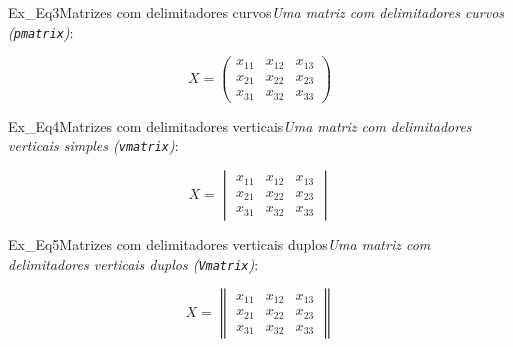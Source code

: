 \begin{texercise}{Ex_Eq3}{Matrizes com delimitadores curvos}\textit{Uma matriz com delimitadores curvos ({\tt pmatrix})}:\par\smallskip%
\begin{tcboutputlisting}
    \begin{center}
        \begin{equation*}
            X =
            \begin{pmatrix} 
                x_{11} & x_{12} & x_{13} \\ 
                x_{21} & x_{22} & x_{23} \\ 
                x_{31} & x_{32} & x_{33} 
            \end{pmatrix}
        \end{equation*}
    \end{center}
\end{tcboutputlisting}
\tcbuselistingtext%
\end{texercise}

\begin{texercise}{Ex_Eq4}{Matrizes com delimitadores verticais}\textit{Uma matriz com delimitadores verticais simples ({\tt vmatrix})}:\par\smallskip%
\begin{tcboutputlisting}
    \begin{center}
        \begin{equation*}
            X =
            \begin{vmatrix} 
                x_{11} & x_{12} & x_{13} \\ 
                x_{21} & x_{22} & x_{23} \\ 
                x_{31} & x_{32} & x_{33} 
            \end{vmatrix}
        \end{equation*}
    \end{center}
\end{tcboutputlisting}
\tcbuselistingtext%
\end{texercise}

\begin{texercise}{Ex_Eq5}{Matrizes com delimitadores verticais duplos}\textit{Uma matriz com delimitadores verticais duplos ({\tt Vmatrix})}:\par\smallskip%
\begin{tcboutputlisting}
    \begin{center}
        \begin{equation*}
            X =
            \begin{Vmatrix} 
                x_{11} & x_{12} & x_{13} \\ 
                x_{21} & x_{22} & x_{23} \\ 
                x_{31} & x_{32} & x_{33} 
            \end{Vmatrix}
        \end{equation*}
    \end{center}
\end{tcboutputlisting}
\tcbuselistingtext%
\end{texercise}

